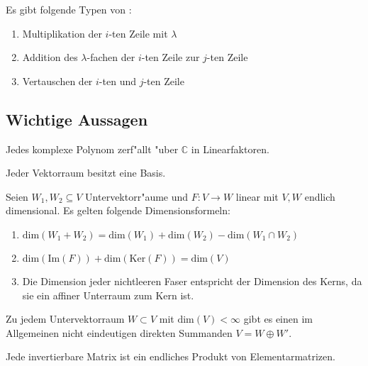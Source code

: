 \documentclass[8pt, a4paper, twocolumn, landscape]{article}
\begin{document}
\begin{definition}
Es gibt folgende Typen von :
\begin{enumerate}
\item Multiplikation der $i$-ten Zeile mit $\lambda$
\item Addition des $\lambda$-fachen der $i$-ten Zeile zur $j$-ten Zeile
\item Vertauschen der $i$-ten und $j$-ten Zeile
\end{enumerate}
\end{definition}

\subsection{Wichtige Aussagen} 

\begin{theorem} 
Jedes komplexe Polynom zerf"allt "uber $\mathbb{C}$ in Linearfaktoren.
\end{theorem}

\begin{theorem}
Jeder Vektorraum besitzt eine Basis.
\end{theorem}

\begin{theorem}
Seien $W_1, W_2 \subseteq V$ Untervektorr"aume und $F: V \rightarrow W$ linear mit $V, W$ endlich dimensional. 
Es gelten folgende Dimensionsformeln:
\begin{enumerate}
\item $\mathrm{dim}(W_1 + W_2) = \mathrm{dim}(W_1) + \mathrm{dim}(W_2) - \mathrm{dim}(W_1 \cap W_2)$
\item $\mathrm{dim}(\mathrm{Im}(F)) + \mathrm{dim}(\mathrm{Ker}(F)) = \mathrm{dim}(V)$
\item Die Dimension jeder nichtleeren Faser entspricht der Dimension des Kerns, da sie ein affiner Unterraum zum Kern ist.
\end{enumerate}
\end{theorem}

\begin{theorem}
Zu jedem Untervektorraum $W \subset V$  mit $\mathrm{dim}(V) < \infty $ gibt es einen im Allgemeinen nicht eindeutigen direkten Summanden $V = W \oplus W'$.
\end{theorem}

\begin{theorem}
Jede invertierbare Matrix ist ein endliches Produkt von Elementarmatrizen.
\end{theorem}
\end{document}
